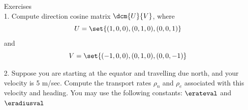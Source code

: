 \begin{frame}
Exercises\\

1.  Compute direction cosine matrix $\dcm{U}{V}$, where 
\[U=\set{(1,0,0),(0,1,0),(0,0,1)}\] 
and \[V=\set{(-1,0,0),(0,1,0),(0,0,-1)}\]

2. Suppose you are starting at the equator and travelling due north, and your velocity is 5 m/sec.  Compute the transport rates $\rho_n$ and $\rho_e$ associated with this velocity and heading.  You may use the following constants: $\erateval$ and $\eradiusval$
\end{frame}
